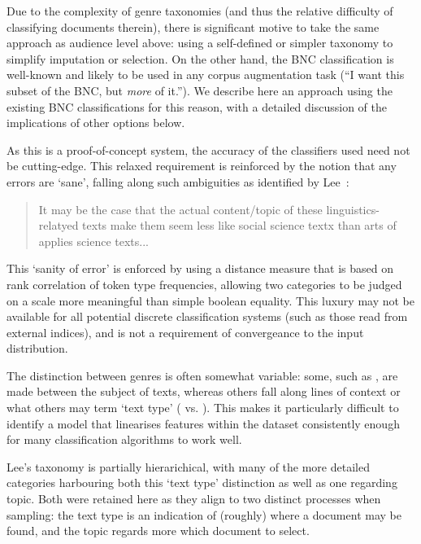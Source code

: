 Due to the complexity of genre taxonomies (and thus the relative difficulty of classifying documents therein), there is significant motive to take the same approach as audience level above: using a self-defined or simpler taxonomy to simplify imputation or selection.  On the other hand, the BNC classification is well-known and likely to be used in any corpus augmentation task (``I want this subset of the BNC, but \textsl{more} of it.'').  We describe here an approach using the existing BNC classifications for this reason, with a detailed discussion of the implications of other options below.


As this is a proof-of-concept system, the accuracy of the classifiers used need not be cutting-edge.  This relaxed requirement is reinforced by the notion that any errors are `sane', falling along such ambiguities as identified by Lee~\cite[p.~11]{lee2003bnc}:

\begin{quote}
It may be the case that the actual content/topic of these linguistics-relatyed texts make them seem less like social science textx than arts of applies science texts...
\end{quote}

This `sanity of error' is enforced by using a distance measure that is based on rank correlation of token type frequencies, allowing two categories to be judged on a scale more meaningful than simple boolean equality.  This luxury may not be available for all potential discrete classification systems (such as those read from external indices), and is not a requirement of convergeance to the input distribution.

The distinction between genres is often somewhat variable: some, such as , are made between the subject of texts, whereas others fall along lines of context or what others may term `text type' ( vs. ).  This makes it particularly difficult to identify a model that linearises features within the dataset consistently enough for many classification algorithms to work well.

Lee's taxonomy is partially hierarichical, with many of the more detailed categories harbouring both this `text type' distinction as well as one regarding topic.  Both were retained here as they align to two distinct processes when sampling: the text type is an indication of (roughly) where a document may be found, and the topic regards more which document to select.

